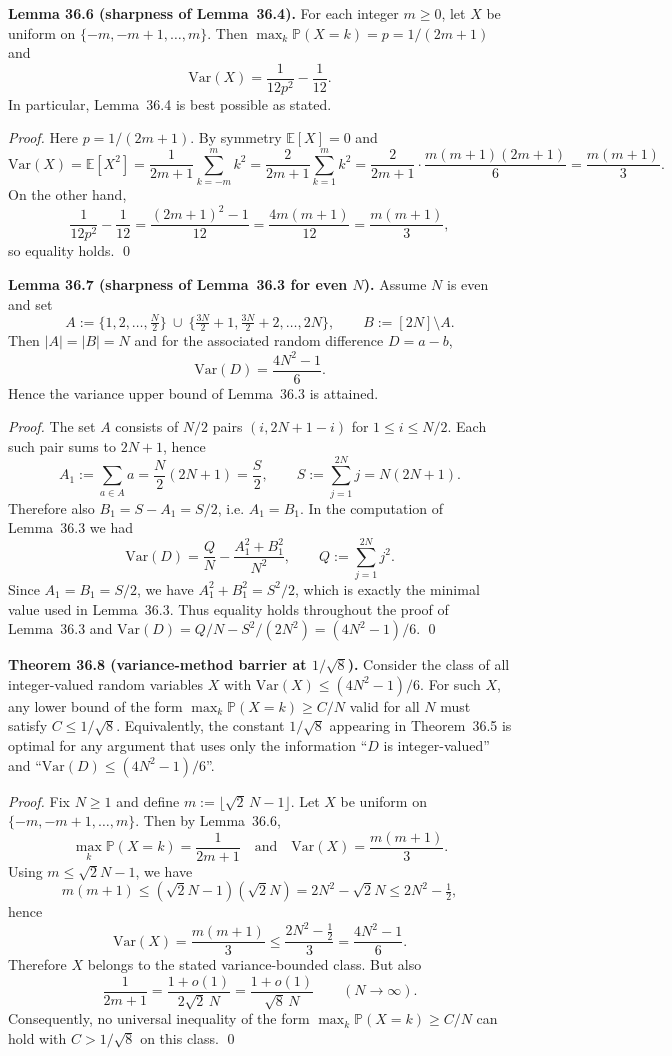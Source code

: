 \medskip
\noindent\textbf{Lemma 36.6 (sharpness of Lemma~36.4).}
For each integer \(m\ge 0\), let \(X\) be uniform on \(\{-m,-m+1,\dots,m\}\).
Then \(\max_k \mathbb P(X=k)=p=1/(2m+1)\) and
\[
\mathrm{Var}(X)=\frac{1}{12p^2}-\frac{1}{12}.
\]
In particular, Lemma~36.4 is best possible as stated.

\noindent\emph{Proof.}
Here \(p=1/(2m+1)\).
By symmetry \(\mathbb E[X]=0\) and
\[
\mathrm{Var}(X)=\mathbb E[X^2]=\frac{1}{2m+1}\sum_{k=-m}^m k^2
=\frac{2}{2m+1}\sum_{k=1}^m k^2
=\frac{2}{2m+1}\cdot\frac{m(m+1)(2m+1)}{6}
=\frac{m(m+1)}{3}.
\]
On the other hand,
\[
\frac{1}{12p^2}-\frac{1}{12}=\frac{(2m+1)^2-1}{12}=\frac{4m(m+1)}{12}=\frac{m(m+1)}{3},
\]
so equality holds.
\qed

\medskip
\noindent\textbf{Lemma 36.7 (sharpness of Lemma~36.3 for even \(N\)).}
Assume \(N\) is even and set
\[
A:=\{1,2,\dots,\tfrac{N}{2}\}\ \cup\ \{\tfrac{3N}{2}+1,\tfrac{3N}{2}+2,\dots,2N\},
\qquad B:=[2N]\setminus A.
\]
Then \(|A|=|B|=N\) and for the associated random difference \(D=a-b\),
\[
\mathrm{Var}(D)=\frac{4N^2-1}{6}.
\]
Hence the variance upper bound of Lemma~36.3 is attained.

\noindent\emph{Proof.}
The set \(A\) consists of \(N/2\) pairs
\((i,2N+1-i)\) for \(1\le i\le N/2\).
Each such pair sums to \(2N+1\), hence
\[
A_1:=\sum_{a\in A} a=\frac{N}{2}(2N+1)=\frac{S}{2},
\qquad S:=\sum_{j=1}^{2N} j = N(2N+1).
\]
Therefore also \(B_1=S-A_1=S/2\), i.e. \(A_1=B_1\).
In the computation of Lemma~36.3 we had
\[
\mathrm{Var}(D)=\frac{Q}{N}-\frac{A_1^2+B_1^2}{N^2},
\qquad Q:=\sum_{j=1}^{2N} j^2.
\]
Since \(A_1=B_1=S/2\), we have \(A_1^2+B_1^2=S^2/2\), which is exactly the minimal value used in Lemma~36.3.
Thus equality holds throughout the proof of Lemma~36.3 and
\(\mathrm{Var}(D)=Q/N-S^2/(2N^2)=(4N^2-1)/6\).
\qed

\medskip
\noindent\textbf{Theorem 36.8 (variance-method barrier at \(1/\sqrt 8\)).}
Consider the class of all integer-valued random variables \(X\) with
\(\mathrm{Var}(X)\le (4N^2-1)/6\).
For such \(X\), any lower bound of the form
\(\max_k \mathbb P(X=k)\ge C/N\) valid for all \(N\) must satisfy
\(C\le 1/\sqrt 8\).
Equivalently, the constant \(1/\sqrt 8\) appearing in Theorem~36.5 is optimal for any argument that uses only the information ``\(D\) is integer-valued'' and ``\(\mathrm{Var}(D)\le (4N^2-1)/6\)''.

\noindent\emph{Proof.}
Fix \(N\ge 1\) and define
\(m:=\lfloor \sqrt{2}\,N-1\rfloor\).
Let \(X\) be uniform on \(\{-m,-m+1,\dots,m\}\).
Then by Lemma~36.6,
\[
\max_k \mathbb P(X=k)=\frac{1}{2m+1}
\quad\text{and}\quad
\mathrm{Var}(X)=\frac{m(m+1)}{3}.
\]
Using \(m\le \sqrt{2}N-1\), we have
\[
 m(m+1)\le (\sqrt{2}N-1)(\sqrt{2}N)=2N^2-\sqrt{2}N\le 2N^2-\tfrac12,
\]
hence
\[
\mathrm{Var}(X)=\frac{m(m+1)}{3}\le \frac{2N^2-\tfrac12}{3}=\frac{4N^2-1}{6}.
\]
Therefore \(X\) belongs to the stated variance-bounded class. But also
\[
\frac{1}{2m+1}=\frac{1+o(1)}{2\sqrt{2}\,N}=\frac{1+o(1)}{\sqrt{8}\,N}
\qquad (N\to\infty).
\]
Consequently, no universal inequality of the form
\(\max_k \mathbb P(X=k)\ge C/N\)
can hold with \(C>1/\sqrt 8\) on this class.
\qed

